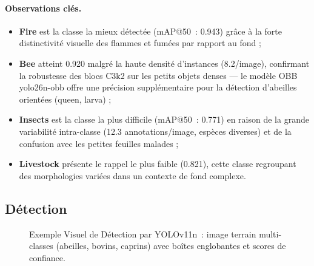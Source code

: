 \paragraph{Observations clés.}
\begin{itemize}
  \item \textbf{Fire} est la classe la mieux détectée (mAP@50~: 0.943) grâce
        à la forte distinctivité visuelle des flammes et fumées par rapport au fond ;
  \item \textbf{Bee} atteint 0.920 malgré la haute densité d'instances (8.2/image),
        confirmant la robustesse des blocs C3k2 sur les petits objets denses — le
        modèle OBB yolo26n-obb offre une précision supplémentaire pour la détection
        d'abeilles orientées (queen, larva) ;
  \item \textbf{Insects} est la classe la plus difficile (mAP@50~: 0.771) en
        raison de la grande variabilité intra-classe (12.3 annotations/image, espèces
        diverses) et de la confusion avec les petites feuilles malades ;
  \item \textbf{Livestock} présente le rappel le plus faible (0.821), cette classe
        regroupant des morphologies variées dans un contexte de fond complexe.
\end{itemize}

\subsection{Détection}
\label{subsec:detection}

\begin{figure}[H]
\centering
{}%
\caption{Exemple Visuel de Détection par YOLOv11n~: image terrain multi-classes
(abeilles, bovins, caprins) avec boîtes englobantes et scores de confiance.}
\label{fig:yolo11_det_example}
\end{figure}

